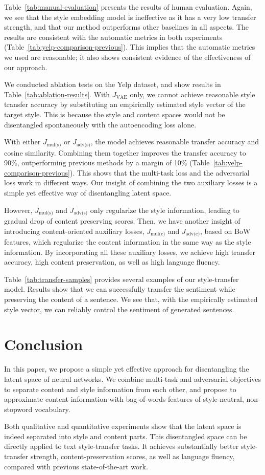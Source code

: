 \documentclass[letterpaper]{article} %
\newcommand{\loss}[1]{J_{\text{#1}}}
\begin{document}
Table~\ref{tab:manual-evaluation} presents the results of human evaluation. Again, we see that the style embedding model \cite{fu2018style} is ineffective as it has a very low transfer strength, and that our method outperforms other baselines in all aspects. The results are consistent with the automatic metrics in both experiments (Table~\ref{tab:yelp-comparison-previous}). This implies that the automatic metrics we used are reasonable; it also shows consistent evidence of the effectiveness of our approach.

We conducted ablation tests on the Yelp dataset, and show results in Table~\ref{tab:ablation-results}. With $\loss{VAE}$ only, we cannot achieve reasonable style transfer accuracy by substituting an empirically estimated style vector of the target style.  This is because the style and content spaces would not be disentangled spontaneously with the autoencoding loss alone.

With either $\loss{mul(s)}$ or $\loss{adv(s)}$, the model achieves reasonable transfer accuracy and cosine similarity. Combining them together improves the transfer accuracy to 90\%, outperforming previous methods by a margin of 10\% (Table~\ref{tab:yelp-comparison-previous}). This shows that the multi-task loss and the adversarial loss work in different ways. Our insight of combining the two auxiliary losses is a simple yet effective way of disentangling latent space.

However, $\loss{mul(s)}$ and $\loss{adv(s)}$ only regularize the style information, leading to gradual drop of content preserving scores. Then, we have another insight of introducing content-oriented auxiliary losses, $\loss{mul(c)}$ and $\loss{adv(c)}$, based on BoW features, which regularize the content information in the same way as the style information. By incorporating all these auxiliary losses, we achieve high transfer accuracy, high content preservation, as well as high language fluency.


Table~\ref{tab:transfer-samples} provides several examples of our style-transfer model. Results show that we can successfully transfer the sentiment while preserving the content of a sentence.
We see that, with the empirically estimated style vector, we can reliably control the sentiment of generated sentences.

\section{Conclusion}
In this paper, we propose a simple yet effective approach for disentangling the latent space of neural networks.
We combine multi-task and adversarial objectives to separate content and style information from each other, and propose to approximate content information with bag-of-words features of style-neutral, non-stopword vocabulary.

Both qualitative and quantitative experiments show that the latent space is indeed separated into style and content parts.
This disentangled space can be directly applied to text style-transfer tasks.
It achieves substantially better style-transfer strength, content-preservation scores, as well as language fluency, compared with previous state-of-the-art work.



\end{document}
